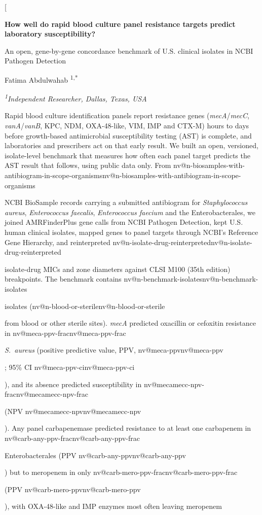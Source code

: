\documentclass[10pt,twocolumn,letterpaper]{article}
\makeatletter
\newcommand{\nv}[1]{\ifcsname nv@#1\endcsname\csname nv@#1\endcsname\else
  \PackageError{numbers}{Unknown number key: #1}{Run build_assets.py}\fi}
\newcommand{\g}[1]{\textit{#1}}  %
\newcommand{\sau}{\textit{S.~aureus}}
\makeatother
\begin{document}
\twocolumn[
\begin{@twocolumnfalse}
\begin{center}
{\large\bfseries How well do rapid blood culture panel resistance targets predict laboratory susceptibility?\par
An open, gene-by-gene concordance benchmark of U.S. clinical isolates in NCBI Pathogen Detection\par}
\vspace{10pt}
{\normalsize Fatima Abdulwahab\,\,\textsuperscript{1,*}\par}
\vspace{4pt}
{\small\itshape \textsuperscript{1}Independent Researcher, Dallas, Texas, USA\par}
\vspace{6pt}
\end{center}
\begin{minipage}{0.84\textwidth}\centering
\begin{minipage}{0.98\textwidth}
\small
Rapid blood culture identification panels report resistance genes (\g{mecA}/\g{mecC}, \g{vanA}/\g{vanB}, KPC, NDM,
OXA-48-like, VIM, IMP and CTX-M) hours to days before growth-based antimicrobial susceptibility testing (AST) is
complete, and laboratories and prescribers act on that early result. We built an open, versioned, isolate-level benchmark
that measures how often each panel target predicts the AST result that follows, using public data only. From
\nv{n-biosamples-with-antibiogram-in-scope-organisms} NCBI BioSample records carrying a submitted antibiogram for
\textit{Staphylococcus aureus}, \textit{Enterococcus faecalis}, \textit{Enterococcus faecium} and the Enterobacterales,
we joined AMRFinderPlus gene calls from NCBI Pathogen Detection, kept U.S. human clinical isolates, mapped genes to panel
targets through NCBI's Reference Gene Hierarchy, and reinterpreted \nv{n-isolate-drug-reinterpreted} isolate-drug MICs and
zone diameters against CLSI M100 (35th edition) breakpoints. The benchmark contains \nv{n-benchmark-isolates} isolates
(\nv{n-blood-or-sterile} from blood or other sterile sites). \g{mecA} predicted oxacillin or cefoxitin resistance in
\nv{meca-ppv-frac} \sau{} (positive predictive value, PPV, \nv{meca-ppv}; 95\% CI \nv{meca-ppv-ci}), and its absence
predicted susceptibility in \nv{mecamecc-npv-frac} (NPV \nv{mecamecc-npv}). Any panel carbapenemase predicted resistance to
at least one carbapenem in \nv{carb-any-ppv-frac} Enterobacterales (PPV \nv{carb-any-ppv}) but to meropenem in only
\nv{carb-mero-ppv-frac} (PPV \nv{carb-mero-ppv}), with OXA-48-like and IMP enzymes most often leaving meropenem

\end{minipage}
\end{minipage}
\end{@twocolumnfalse}
\end{document}

